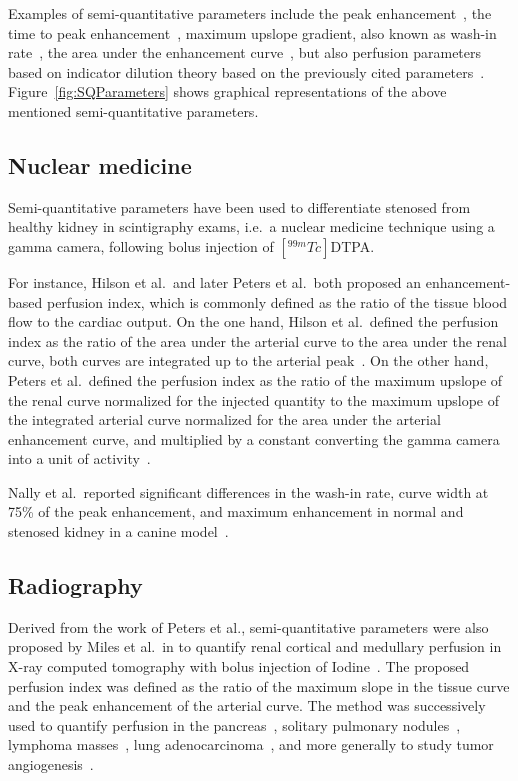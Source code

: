 Examples of semi-quantitative parameters include the peak enhancement~\cite{Norman:1978ji,Nally:1985te,Pettersson:1987ft,Erlemann:1989ib}, the time to peak enhancement~\cite{Norman:1978ji,Erlemann:1989ib,Dietrich:2012kw}, maximum upslope gradient, also known as wash-in rate~\cite{Nally:1985te,Erlemann:1989ib}, the area under the enhancement curve~\cite{Dietrich:2012kw}, but also perfusion parameters based on indicator dilution theory based on the previously cited parameters~\cite{Hilson:1978us,Peters:1987fa,Peters:1987vx,Miles:1991et,Miles:1991ei,Miles:1993cq,Blomley:1995vs,Koenig:1998ir}.
Figure~\ref{fig:SQParameters} shows graphical representations of the above mentioned semi-quantitative parameters. 

\subsection{Nuclear medicine}
\label{sec:SQNM}
Semi-quantitative parameters have been used to differentiate stenosed from healthy kidney in scintigraphy exams, i.e.~a nuclear medicine technique using a gamma camera, following bolus injection of $\left[^{99m}Tc\right]$DTPA.

For instance, Hilson et al.~and later Peters et al.~both proposed an enhancement-based perfusion index, which is commonly defined as the ratio of the tissue blood flow to the cardiac output. 
On the one hand, Hilson et al.~defined the perfusion index as the ratio of the area under the arterial curve to the area under the renal curve, both curves are integrated up to the arterial peak~\cite{Hilson:1978us}.
On the other hand, Peters et al.~defined the perfusion index as the ratio of the maximum upslope of the renal curve normalized for the injected quantity to the maximum upslope of the integrated arterial curve normalized for the area under the arterial enhancement curve, and multiplied by a constant converting the gamma camera into a unit of activity~\cite{Peters:1987fa,Peters:1987vx}. 

Nally et al.~reported significant differences in the wash-in rate, curve width at 75\% of the peak enhancement, and maximum enhancement in normal and stenosed kidney in a canine model~\cite{Nally:1985te}. 


\subsection{Radiography}
\label{sec:SQRadiography}
Derived from the work of Peters et al., semi-quantitative parameters were also proposed by Miles et al.~in \citeyear{Miles:1991et} to quantify renal cortical and medullary perfusion in X-ray computed tomography with bolus injection of Iodine~\cite{Miles:1991et,Miles:1991ei}. 
The proposed perfusion index was defined as the ratio of the maximum slope in the tissue curve and the peak enhancement of the arterial curve. 
The method was successively used to quantify perfusion in the pancreas~\cite{Miles:2014ea}, solitary pulmonary nodules~\cite{Zhang:1997bi}, lymphoma masses~\cite{Dugdale:1999co}, lung adenocarcinoma~\cite{Tateishi:2001fz}, and more generally to study tumor angiogenesis~\cite{Tateishi:2001fz,Miles:2002eu}.

